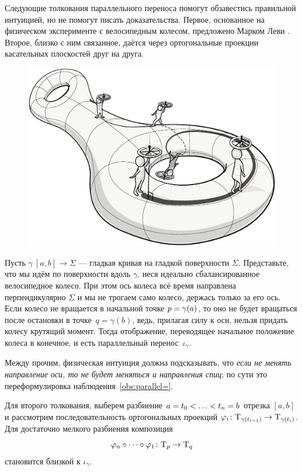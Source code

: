 Следующие толкования параллельного переноса помогут обзавестись правильной интуицией,
но не помогут писать доказательства.
Первое, основанное на физическом эксперименте с велосипедным колесом, предложено Марком Леви \cite{levi}.
Второе, близко с ним связанное, даётся через ортогональные проекции касательных плоскостей друг на друга.

\begin{figure}[ht!]
\vskip-0mm
\centering
\includegraphics[scale=.3]{pics/parallel_transport}
\end{figure}

Пусть $\gamma\:[a,b]\to\Sigma$ --- гладкая кривая на гладкой поверхности $\Sigma$.
Представьте, что мы идём по поверхности вдоль $\gamma$, неся идеально сбалансированное велосипедное колесо.
При этом ось колеса всё время направлена перпендикулярно $\Sigma$ и мы не трогаем само колесо, держась только за его ось.
Если колесо не вращается в начальной точке $p\z=\gamma(a)$, то оно не будет вращаться после остановки в точке~$q=\gamma(b)$, ведь, прилагая силу к оси, нельзя придать колесу крутящий момент.
Тогда отображение, переводящее начальное положение колеса в конечное, и есть параллельный перенос~$\iota_\gamma$.

Между прочим, физическая интуиция должна подсказывать, что \textit{если не менять направление оси, то не будет меняться и направления спиц};
по сути это переформулировка наблюдения~\ref{obs:parallel=}.

Для второго толкования, выберем разбиение $a=t_0<\dots\z<t_n=b$ отрезка $[a,b]$
и рассмотрим последовательность ортогональных проекций $\varphi_i\colon\mathrm{T}_{\gamma(t_{i-1})}\to\mathrm{T}_{\gamma(t_i)}$.
Для достаточно мелкого разбиения композиция 
\[\phi_n\circ\dots\circ\phi_1\:\T_p\z\to\T_q\]
становится близкой к $\iota_\gamma$.

